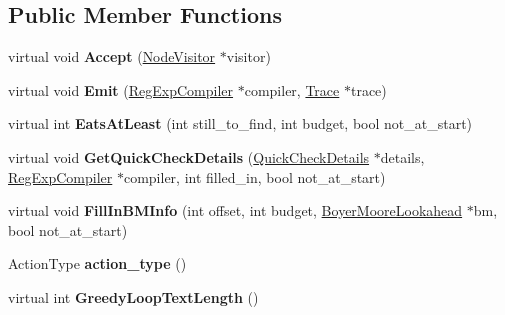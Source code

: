 \subsection*{Public Member Functions}
\begin{DoxyCompactItemize}
\item 
\hypertarget{classv8_1_1internal_1_1_action_node_acd110b20896658ef66be07589828c835}{}virtual void {\bfseries Accept} (\hyperlink{classv8_1_1internal_1_1_node_visitor}{Node\+Visitor} $\ast$visitor)\label{classv8_1_1internal_1_1_action_node_acd110b20896658ef66be07589828c835}

\item 
\hypertarget{classv8_1_1internal_1_1_action_node_afac185d923c63324c4f18a2f0a23769d}{}virtual void {\bfseries Emit} (\hyperlink{classv8_1_1internal_1_1_reg_exp_compiler}{Reg\+Exp\+Compiler} $\ast$compiler, \hyperlink{classv8_1_1internal_1_1_trace}{Trace} $\ast$trace)\label{classv8_1_1internal_1_1_action_node_afac185d923c63324c4f18a2f0a23769d}

\item 
\hypertarget{classv8_1_1internal_1_1_action_node_ab36ade74ae2623b654002605bb0c5144}{}virtual int {\bfseries Eats\+At\+Least} (int still\+\_\+to\+\_\+find, int budget, bool not\+\_\+at\+\_\+start)\label{classv8_1_1internal_1_1_action_node_ab36ade74ae2623b654002605bb0c5144}

\item 
\hypertarget{classv8_1_1internal_1_1_action_node_abc51b0f5a4a393425181f6a0583e6b0a}{}virtual void {\bfseries Get\+Quick\+Check\+Details} (\hyperlink{classv8_1_1internal_1_1_quick_check_details}{Quick\+Check\+Details} $\ast$details, \hyperlink{classv8_1_1internal_1_1_reg_exp_compiler}{Reg\+Exp\+Compiler} $\ast$compiler, int filled\+\_\+in, bool not\+\_\+at\+\_\+start)\label{classv8_1_1internal_1_1_action_node_abc51b0f5a4a393425181f6a0583e6b0a}

\item 
\hypertarget{classv8_1_1internal_1_1_action_node_a0903fcf481793c0ffed3b875476fb592}{}virtual void {\bfseries Fill\+In\+B\+M\+Info} (int offset, int budget, \hyperlink{classv8_1_1internal_1_1_boyer_moore_lookahead}{Boyer\+Moore\+Lookahead} $\ast$bm, bool not\+\_\+at\+\_\+start)\label{classv8_1_1internal_1_1_action_node_a0903fcf481793c0ffed3b875476fb592}

\item 
\hypertarget{classv8_1_1internal_1_1_action_node_ae848c71b17d244a67f3f34afe142fac8}{}Action\+Type {\bfseries action\+\_\+type} ()\label{classv8_1_1internal_1_1_action_node_ae848c71b17d244a67f3f34afe142fac8}

\item 
\hypertarget{classv8_1_1internal_1_1_action_node_a22be07519e46e566272847427d939793}{}virtual int {\bfseries Greedy\+Loop\+Text\+Length} ()\label{classv8_1_1internal_1_1_action_node_a22be07519e46e566272847427d939793}

\end{DoxyCompactItemize}
